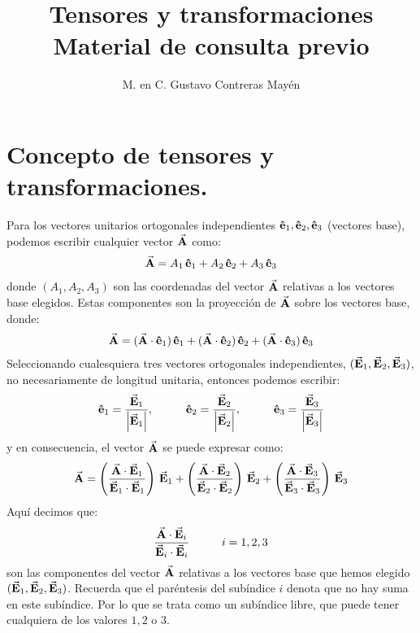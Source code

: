 \documentclass[hidelinks,12pt]{article}
\title{Tensores y transformaciones \\ \large{Material de consulta previo}\vspace{-3ex}}
\author{M. en C. Gustavo Contreras Mayén}
\date{ }
\begin{document}
\vspace{-4cm}
\maketitle
\fontsize{14}{14}\selectfont
\tableofcontents
\newpage


\section{Concepto de tensores y transformaciones.}

Para los vectores unitarios ortogonales independientes $\vu{e}_{1}, \vu{e}_2, \vu{e}_{3}$ (vectores base), podemos escribir cualquier vector $\va{A}$ como:
\begin{align*}
\va{A} = A_{1} \, \vu{e}_{1} + A_{2} \, \vu{e}_{2} + A_{3} \, \vu{e}_{3}
\end{align*}
donde $(A_{1}, A_{2}, A_{3})$ son las coordenadas del vector $\va{A}$ relativas a los vectores base elegidos. Estas componentes son la proyección de $\va{A}$ sobre los vectores base, donde:
\begin{align*}
\va{A} = (\va{A} \cdot \vu{e}_{1}) \, \vu{e}_{1} + (\va{A} \cdot \vu{e}_{2}) \, \vu{e}_{2} + (\va{A} \cdot \vu{e}_{3}) \, \vu{e}_{3}
\end{align*}
Seleccionando cualesquiera tres vectores ortogonales independientes, \hfill \break $(\va{E}_{1}, \va{E}_{2}, \va{E}_{3})$, no necesariamente de longitud unitaria, entonces podemos escribir:
\begin{align*}
\vu{e}_{1} = \dfrac{\va{E}_{1}}{\abs{\va{E}_{1}}}, \hspace{1cm} \vu{e}_{2} = \dfrac{\va{E}_{2}}{\abs{\va{E}_{2}}}, \hspace{1cm} \vu{e}_{3} = \dfrac{\va{E}_{3}}{\abs{\va{E}_{3}}}
\end{align*}
y en consecuencia, el vector $\va{A}$ se puede expresar como:
\begin{align*}
\va{A} = \left( \dfrac{\va{A} \cdot \va{E}_{1}}{\va{E}_{1} \cdot \va{E}_{1}} \right) \, \va{E}_{1} + \left( \dfrac{\va{A} \cdot \va{E}_{2}}{\va{E}_{2} \cdot \va{E}_{2}} \right) \, \va{E}_{2} + \left( \dfrac{\va{A} \cdot \va{E}_{3}}{\va{E}_{3} \cdot \va{E}_{3}} \right) \, \va{E}_{3} 
\end{align*}
Aquí decimos que:
\begin{align*}
\dfrac{\va{A} \cdot \va{E}_{i}}{\va{E}_{i} \cdot \va{E}_{i}} \hspace{1cm} i = 1, 2, 3
\end{align*}
son las componentes del vector $\va{A}$ relativas a los vectores base que hemos elegido $(\va{E}_{1}, \va{E}_{2}, \va{E}_{3})$. Recuerda que el paréntesis del subíndice $i$ denota que no hay suma en este subíndice. Por lo que se trata como un subíndice libre, que puede tener cualquiera de los valores $1, 2$ o $3$.
\end{document}
